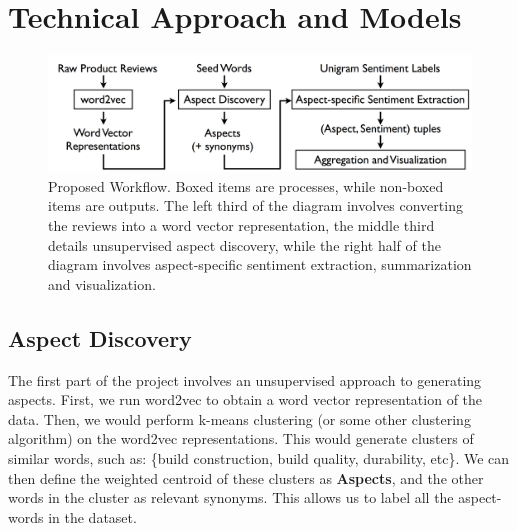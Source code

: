 \documentclass{article} %
\begin{document}
\section{Technical Approach and Models} 

\begin{figure}[h]
\begin{center}
\includegraphics[width=1\columnwidth]{workflow.png}
\end{center}
\caption{Proposed Workflow. Boxed items are processes, while non-boxed items are outputs. The left third of the diagram involves converting the reviews into a word vector representation, the middle third details unsupervised aspect discovery, while the right half of the diagram involves aspect-specific sentiment extraction, summarization and visualization.}%
\label{workflow}
\end{figure}



\subsection{Aspect Discovery}

The first part of the project involves an unsupervised approach to generating aspects. First, we run word2vec to obtain a word vector representation of the data. Then, we would perform k-means clustering (or some other clustering algorithm) on the word2vec representations. This would generate clusters of similar words, such as: \{build construction, build quality, durability, etc\}. We can then define the weighted centroid of these clusters as {\bf Aspects}, and the other words in the cluster as relevant synonyms. This allows us to label all the aspect-words in the dataset.


\end{document}
